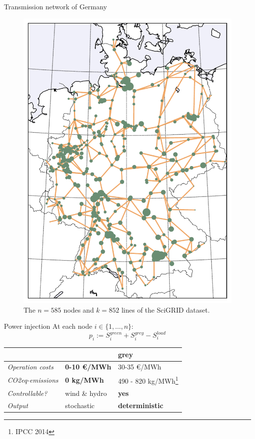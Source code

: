 \documentclass[10pt]{beamer}
\newcommand{\mel}[1]{\ensuremath{{{#1}}}}
\begin{document}
\begin{frame}{Transmission network of Germany}
    \begin{figure}
    \includegraphics[height=.69\paperheight]{img/nominalload.pdf}
    \caption{The $n=585$ nodes and $k=852$ lines of the SciGRID dataset.}
    \end{figure}
\end{frame}

\begin{frame}{Power injection}
    At each node $i\in\{1,\dots,n\}$:
    \[\mel{p}_i := S^{green}_i + S^{grey}_i - S^{load}_i\]
    \begin{table}[]
\begin{tabular}{l|ll}
\toprule
                         & \color{renewablegreen}{\textbf{green}} & \textbf{\textbf{grey}} \\
                         \midrule
\emph{Operation costs} & \textbf{0-10 €/MWh}       & 30-35 €/MWh      \\
\emph{CO2eq-emissions} & \textbf{0 kg/MWh}          & 490 - 820 kg/MWh\footnote{IPCC 2014} \\
\emph{Controllable?}   & wind \& hydro               & \textbf{yes}             \\
\emph{Output}          & stochastic       & \textbf{deterministic}\\
\bottomrule
\end{tabular}
\end{table}
\end{frame}
\end{document}
